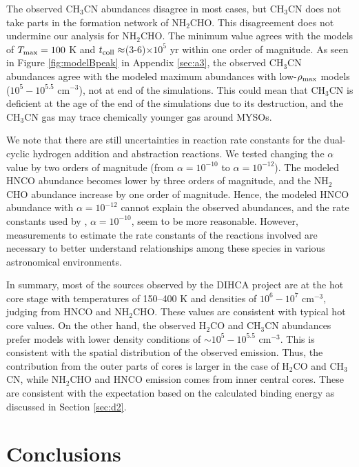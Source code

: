 \documentclass[twocolumn, twocolappendix]{aastex631}
\begin{document}
The observed CH$_{3}$CN abundances disagree in most cases, but CH$_{3}$CN does not take parts in the formation network of NH$_{2}$CHO. 
This disagreement does not undermine our analysis for NH$_{2}$CHO.   
The minimum value agrees with the models of $T_{\rm {max}}=100$ K and $t_{\rm {coll}}\approx$(3-6)$\times10^{5}$ yr within one order of magnitude.
As seen in Figure \ref{fig:modelBpeak} in Appendix \ref{sec:a3}, the observed CH$_{3}$CN abundances agree with the modeled maximum abundances with low-$\rho_{\rm {max}}$ models ($10^5-10^{5.5}$ cm$^{-3}$), not at end of the simulations.
This could mean that CH$_{3}$CN is deficient at the age of the end of the simulations due to its destruction, and the CH$_{3}$CN gas may trace chemically younger gas around MYSOs.

We note that there are still uncertainties in reaction rate constants for the dual-cyclic hydrogen addition and abstraction reactions.
We tested changing the $\alpha$ value by two orders of magnitude (from $\alpha=10^{-10}$ to $\alpha=10^{-12}$).
The modeled HNCO abundance becomes lower by three orders of magnitude, and the NH$_{2}$CHO abundance increase by one order of magnitude.
Hence, the modeled HNCO abundance with $\alpha=10^{-12}$ cannot explain the observed abundances, and the rate constants used by \citet{2020ApJ...895...86G}, $\alpha=10^{-10}$, seem to be more reasonable.
However, measurements to estimate the rate constants of the reactions involved are necessary to better understand relationships among these species in various astronomical environments.

In summary, most of the sources observed by the DIHCA project are at the hot core stage with temperatures of 150--400 K and densities of $10^{6}-10^{7}$ cm$^{-3}$, judging from HNCO and NH$_{2}$CHO.
These values are consistent with typical hot core values.
On the other hand, the observed H$_{2}$CO and CH$_{3}$CN abundances prefer models with lower density conditions of $\sim10^{5}-10^{5.5}$ cm$^{-3}$.
This is consistent with the spatial distribution of the observed emission.
Thus, the contribution from the outer parts of cores is larger in the case of H$_{2}$CO and CH$_{3}$CN, while NH$_{2}$CHO and HNCO emission comes from inner central cores.
These are consistent with the expectation based on the calculated binding energy as discussed in Section \ref{sec:d2}.

\section{Conclusions} \label{sec:conclusion}
\end{document}
